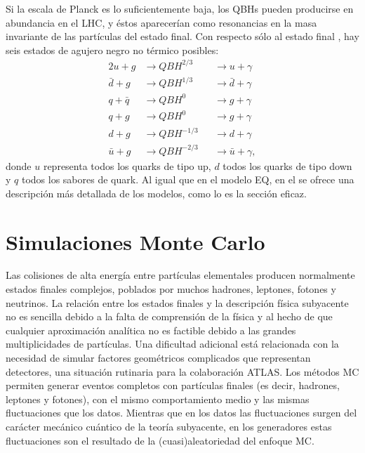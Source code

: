 Si la escala de Planck es lo suficientemente baja, los \acp{QBH} pueden producirse en abundancia en el \ac{LHC}, y éstos aparecerían como resonancias en la masa invariante de las partículas del estado final. Con respecto sólo al estado final \gammajet, hay seis estados de agujero negro no térmico posibles:
\begin{alignat*}{2}
    u + g       & \to QBH^{2/3}     && \to u + \gamma\\
    \bar{d} + g & \to QBH^{1/3}     && \to \bar{d} + \gamma\\
    q + \bar{q} & \to QBH^{0}       && \to g + \gamma\\
    q + g       & \to QBH^{0}       && \to g + \gamma\\
    d + g       & \to QBH^{-1/3}    && \to d + \gamma\\
    \bar{u} + g & \to QBH^{-2/3}    && \to \bar{u} + \gamma,
\end{alignat*}
donde \(u\) representa todos los quarks de tipo up, \(d\) todos los quarks de tipo down y \(q\) todos los sabores de quark. Al igual que en el modelo \ac{EQ}, en el \Ch{\ref{ch:samples}} se ofrece una descripción más detallada de los modelos, como lo es la secci\'on eficaz.












\section{Simulaciones Monte Carlo}
\label{sec:theory:mc_simulation}


Las colisiones de alta energía entre partículas elementales producen normalmente estados finales complejos, poblados por muchos hadrones, leptones, fotones y neutrinos. La relación entre los estados finales y la descripción física subyacente no es sencilla debido a la falta de comprensión de la física y al hecho de que cualquier aproximación analítica no es factible debido a las grandes multiplicidades de partículas. Una dificultad adicional está relacionada con la necesidad de simular factores geométricos complicados que representan detectores, una situación rutinaria para la colaboraci\'on \ac{ATLAS}.
Los métodos \ac{MC} permiten generar eventos completos con partículas finales (es decir, hadrones, leptones y fotones), con el mismo comportamiento medio y las mismas fluctuaciones que los datos. Mientras que en los datos las fluctuaciones surgen del carácter mecánico cuántico de la teoría subyacente, en los generadores estas fluctuaciones son el resultado de la (cuasi)aleatoriedad del enfoque \ac{MC}.

